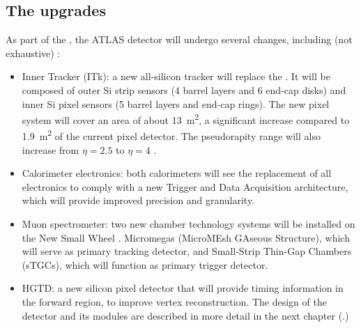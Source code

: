 \subsection{The upgrades}\label{subsec:ATLAS_upgrades}

As part of the , the ATLAS detector will undergo several changes, including (not exhaustive) \cite{MANGHI2024169917}:

\begin{itemize}
    \item Inner Tracker (ITk): a new all-silicon tracker will replace the . It will be composed of outer Si strip sensors (4 barrel layers and 6 end-cap disks) and inner Si pixel sensors (5 barrel layers and end-cap rings). The new pixel system will cover an area of about \qty{13}{\meter^2}, a significant increase compared to \qty{1.9}{\meter^2} of the current pixel detector. The pseudorapity range will also increase from $\eta=2.5$ to $\eta=4$ \cite{BUTTAR2025169978}.
    \item Calorimeter electronics: both calorimeters will see the replacement of all electronics to comply with a new Trigger and Data Acquisition architecture, which will provide improved precision and granularity. 
    \item Muon spectrometer: two new chamber technology systems \cite{2106380} will be installed on the New Small Wheel \cite{Kawamoto:2013udg}. Micromegas (MicroMEsh GAseous Structure), which will serve as primary tracking detector, and Small-Strip Thin-Gap Chambers (sTGCs), which will function as primary trigger detector.
    \item HGTD: a new silicon pixel detector that will provide timing information in the forward region, to improve vertex reconstruction. The design of the detector and its modules are described in more detail in the next chapter (.)
\end{itemize}


